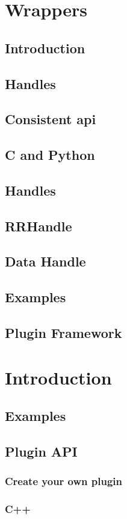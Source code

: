 \documentclass[12pt, letter, oneside]{book}
\begin{document}
\section{Wrappers}
\subsection{Introduction}
\subsection{Handles}
\subsection{Consistent api}
\subsection{C and Python}
\subsection{Handles}
\subsection{RRHandle}
\subsection{Data Handle}
\subsection{Examples}
\subsection{Plugin Framework }
\section{Introduction}
\subsection{Examples}
\subsection{Plugin API}
\subsubsection{Create your own plugin}
\subsubsection{C++}
\end{document}
